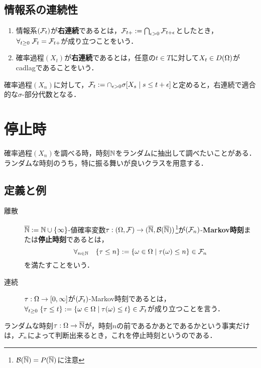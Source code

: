 \documentclass[uplatex,dvipdfmx]{jsreport}
\begin{document}
\subsection{情報系の連続性}

\begin{definition}\mbox{}
    \begin{enumerate}
        \item 情報系$(\mathcal{F}_t)$が\textbf{右連続}であるとは，$\mathcal{F}_{t+}:=\bigcap_{\epsilon>0}\mathcal{F}_{t+\epsilon}$としたとき，$\forall_{t\ge0}\;\mathcal{F}_t=\mathcal{F}_{t+}$が成り立つことをいう．
        \item 確率過程$(X_t)$が\textbf{右連続}であるとは，任意の$t\in T$に対して$X_t\in D(\Omega)$がcadlagであることをいう．
    \end{enumerate}
\end{definition}

\begin{example}
    確率過程$(X_n)$に対して，$\mathcal{F}_t:=\cap_{\epsilon>0}\sigma[X_s\mid s\le t+\epsilon]$と定めると，右連続で適合的な$\sigma$-部分代数となる．
\end{example}

\section{停止時}

\begin{tcolorbox}[colframe=ForestGreen, colback=ForestGreen!10!white,breakable,colbacktitle=ForestGreen!40!white,coltitle=black,fonttitle=\bfseries\sffamily,
title=]
    確率過程$(X_n)$を調べる時，時刻$\mathbb{N}$をランダムに抽出して調べたいことがある．
    ランダムな時刻のうち，特に振る舞いが良いクラスを用意する．
\end{tcolorbox}

\subsection{定義と例}

\begin{definition}\mbox{}
    \begin{description}
        \item[離散]$\overline{\mathbb{N}}:=\mathbb{N}\cup\{\infty\}$-値確率変数$\tau:(\Omega,\mathcal{F})\to(\overline{\mathbb{N}},\mathcal{B}(\overline{\mathbb{N}}))$\footnote{$\mathcal{B}(\overline{\mathbb{N}})=P(\overline{\mathbb{N}})$に注意}が$(\mathcal{F}_n)$-\textbf{Markov時刻}または\textbf{停止時刻}であるとは，
        \[\forall_{n\in\mathbb{N}}\quad\{\tau\le n\}:=\left\{\omega\in\Omega\mid\tau(\omega)\le n\right\}\in\mathcal{F}_n\]
        を満たすことをいう．
        \item[連続] $\tau:\Omega\to[0,\infty]$が$(\mathcal{F}_t)$-Markov時刻であるとは，$\forall_{t\ge0}\;\{\tau\le t\}:=\left\{\omega\in\Omega\mid\tau(\omega)\le t\right\}\in\mathcal{F}_t$が成り立つことを言う．
    \end{description}
\end{definition}
\begin{remarks}
    ランダムな時刻$\tau:\Omega\to\overline{\mathbb{N}}$が，時刻$n$の前であるかあとであるかという事実だけは，$\mathcal{F}_n$によって判断出来るとき，これを停止時刻というのである．
\end{remarks}
\end{document}
